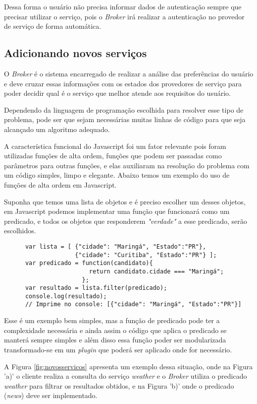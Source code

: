 Dessa forma o usuário não precisa informar dados de autenticação sempre que precisar utilizar o serviço, pois o \textit{Broker} irá realizar a autenticação no provedor de serviço de forma automática.

\subsection{Adicionando novos serviços}
O \textit{Broker} é o sistema encarregado de realizar a análise das preferências do usuário e deve cruzar essas informações com os estados dos provedores de serviço para poder decidir qual é o serviço que melhor atende aos requisitos do usuário.

Dependendo da linguagem de programação escolhida para resolver esse tipo de problema, pode ser que sejam necessárias muitas linhas de código para que seja alcançado um algoritmo adequado.

A característica funcional do Javascript foi um fator relevante pois foram utilizadas funções de alta ordem, funções que podem ser passadas como parâmetros para outras funções, e elas auxiliaram na resolução do problema com um código simples, limpo e elegante. Abaixo temos um exemplo do uso de funções de alta ordem em Javascript.

Suponha que temos uma lista de objetos e é preciso escolher um desses objetos, em Javascript podemos implementar uma função que funcionará como um predicado, e todos os objetos que responderem \textit{"verdade"} a esse predicado, serão escolhidos.

\begin{verbatim}
      var lista = [ {"cidade": "Maringá", "Estado":"PR"},
                    {"cidade": "Curitiba", "Estado":"PR"} ];
      var predicado = function(candidato){
                        return candidato.cidade === "Maringá";
                      };
      var resultado = lista.filter(predicado);
      console.log(resultado);
      // Imprime no console: [{"cidade": "Maringá", "Estado":"PR"}]
\end{verbatim}

Esse é um exemplo bem simples, mas a função de predicado pode ter a complexidade necessária e ainda assim o código que aplica o predicado se manterá sempre simples e além disso essa função poder ser modularizada transformado-se em um \textit{plugin} que poderá ser aplicado onde for necessário.

A Figura \ref{fig:novosservicos} apresenta um exemplo dessa situação, onde na Figura 'a)' o cliente realiza a consulta do serviço \textit{weather} e o \textit{Broker} utiliza o predicado \textit{weather} para filtrar os resultados obtidos, e na Figura 'b)' onde o predicado (\textit{news}) deve ser implementado.

